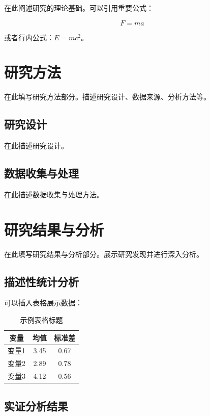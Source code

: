 \documentclass[hyperref,a4paper,UTF8]{ctexart}
\begin{document}
在此阐述研究的理论基础。可以引用重要公式：

\begin{equation}
    F = ma
\end{equation}

或者行内公式：$E = mc^2$。

\section{研究方法}

在此填写研究方法部分。描述研究设计、数据来源、分析方法等。

\subsection{研究设计}

在此描述研究设计。

\subsection{数据收集与处理}

在此描述数据收集与处理方法。

\section{研究结果与分析}

在此填写研究结果与分析部分。展示研究发现并进行深入分析。

\subsection{描述性统计分析}

可以插入表格展示数据：

\begin{table}[h]
\centering
\caption{示例表格标题}
\begin{tabular}{|c|c|c|}
\hline
\textbf{变量} & \textbf{均值} & \textbf{标准差} \\
\hline
变量1 & 3.45 & 0.67 \\
变量2 & 2.89 & 0.78 \\
变量3 & 4.12 & 0.56 \\
\hline
\end{tabular}
\end{table}

\subsection{实证分析结果}
\end{document}

